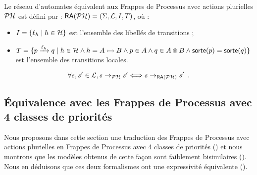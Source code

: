 \begin{definition}
  Le réseau d'automates équivalent aux Frappes de Processus avec actions plurielles $\mathcal{PH}$
  est défini par : $\mathsf{RA}(\mathcal{PH}) = (\Sigma, \mathcal{L}, I, T)$, où :
  \begin{itemize}
    \item $I = \{ \ell_h \mid h \in \mathcal{H} \}$ est l'ensemble des libellés de transitions ;
    \item $T = \{ p \xrightarrow{\ell_h} q \mid
      h \in \mathcal{H} \wedge h = \mbox{$A \rightarrowtail B$} \wedge p \in A \wedge q \in A \Cap B \wedge
      \mathsf{sorte}(p) = \mathsf{sorte}(q) \}$ est l'ensemble des transitions locales.
  \end{itemize}
\end{definition}

\begin{theorem}[$\PH \approx \phmtoan$]
  \[\forall s, s' \in \mathcal{L}, s \rightarrow_{\mathcal{PH}} s' \Longleftrightarrow s \rightarrow_{\mathsf{RA}(\mathcal{PH})} s' \enspace.\]
\end{theorem}




\subsection{Équivalence avec les Frappes de Processus avec 4 classes de priorités}

Nous proposons dans cette section une traduction des Frappes de Processus
avec actions plurielles en Frappes de Processus avec 4 classes de priorités ()
et nous montrons que les modèles obtenus de cette façon sont faiblement bisimilaires
().
Nous en déduisons que ces deux formalismes ont une expressivité équivalente ().


